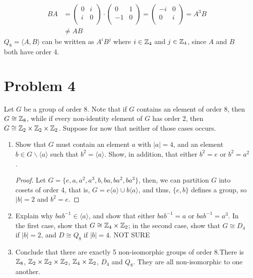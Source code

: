 \documentclass[a4paper,12pt]{extarticle}
\theoremstyle{definition}
\begin{document}
        \begin{align*}
            BA&=\begin{pmatrix}
        0 & i\\
        i & 0\\
        \end{pmatrix}\cdot\begin{pmatrix}
        0 & 1\\
        -1 & 0\\
        \end{pmatrix}=\begin{pmatrix}
        -i & 0\\
        0 & i\\
        \end{pmatrix}=A^3B\\
        &\neq AB
        \end{align*}
        $Q_8=\langle A,B\rangle$ can be written as $A^iB^j$ where $i\in\mathbb{Z}_4$ and $j\in\mathbb{Z}_4$, since $A$ and $B$ both have order 4.
        \section*{Problem 4}
        Let $G$ be a group of order 8. Note that if $G$ contains an element of order 8, then $G\cong\mathbb{Z}_8$, while if every non-identity element of $G$ has order 2, then $G\cong\mathbb{Z}_2\times\mathbb{Z}_2\times\mathbb{Z}_2$. Suppose for now that neither of those cases occurs.
        \begin{enumerate}
            \item Show that $G$ must contain an element $a$ with $|a|=4$, and an element $b\in G\backslash\langle a\rangle$ such that $b^2=\langle a\rangle$. Show, in addition, that either $b^2=e$ or $b^2=a^2$.\begin{proof}
            Let $G=\{e,a,a^2,a^3,b,ba,ba^2,ba^3\}$, then, we can partition $G$ into cosets of order 4, that is, $G=e\langle a\rangle\cup b\langle a\rangle$, and thus, $\{e,b\}$ defines a group, so $|b|=2$ and $b^2=e$.
            \end{proof}
            \item Explain why $bab^{-1}\in\langle a\rangle$, and show that either $bab^{-1}=a$ or $bab^{-1}=a^3$. In the first case, show that $G\cong\mathbb{Z}_4\times\mathbb{Z}_2$; in the second case, show that $G\cong D_4$ if $|b|=2$, and $D\cong Q_8$ if $|b|=4$. NOT SURE
            \item Conclude that there are exactly 5 non-isomorphic groups of order 8.\myskip There is $\mathbb{Z}_8$, $\mathbb{Z}_2\times\mathbb{Z}_2\times\mathbb{Z}_2$, $\mathbb{Z}_4\times\mathbb{Z}_2$, $D_4$ and $Q_8$. They are all non-isomorphic to one another.
        \end{enumerate}
\end{document}
